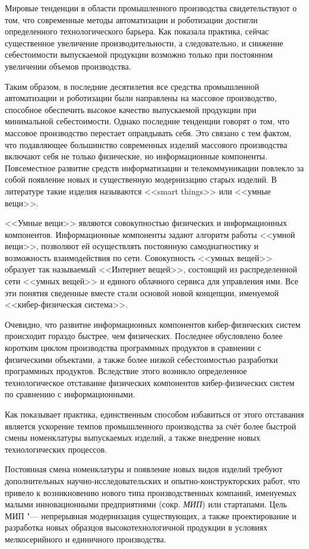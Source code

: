 
{\actuality} Мировые тенденции в области промышленного производства свидетельствуют о том, что современные методы автоматизации и роботизации достигли определенного технологического барьера. Как показала практика, сейчас существенное увеличение производительности, а следовательно, и снижение себестоимости выпускаемой продукции возможно только при постоянном увеличении объемов производства.

Таким образом, в последние десятилетия все средства промышленной автоматизации и роботизации были направлены на массовое производство, способное обеспечить высокое качество выпускаемой продукции при минимальной себестоимости. Однако последние тенденции говорят о том, что массовое производство перестает оправдывать себя. Это связано с тем фактом, что подавляющее большинство современных изделий массового производства включают себя не только физические, но информационные компоненты. Повсеместное развитие средств информатизации и телекоммуникации повлекло за собой появление новых и существенную модернизацию старых изделий. В литературе такие изделия называются <<smart things>> или <<умные вещи>>. 

<<Умные вещи>> являются совокупностью физических и информационных компонентов. Информационные компоненты задают алгоритм работы <<умной вещи>>, позволяют ей осуществлять постоянную самодиагностику и возможность взаимодействия по сети.  Совокупность <<умных вещей>> образует так называемый <<Интернет вещей>>, состоящий из распределенной сети <<умных вещей>> и единого облачного сервиса для управления ими. Все эти понятия сведенные вместе стали основой новой концепции, именуемой <<кибер-физическая система>>.

Очевидно, что развитие информационных компонентов кибер-физических систем происходит гораздо быстрее, чем физических. Последнее обусловлено более коротким циклом производства программных продуктов в сравнении с физическими объектами, а также более низкой себестоимостью разработки программных продуктов. Вследствие этого возникло определенное технологическое отставание физических компонентов кибер-физических систем по сравнению с информационными.

Как показывает практика, единственным способом избавиться от этого отставания является ускорение темпов промышленного производства за счёт более быстрой смены номенклатуры выпускаемых изделий, а также внедрение новых технологических процессов.

Постоянная смена номенклатуры и появление новых видов изделий требуют дополнительных научно-исследовательских и опытно-конструкторских работ, что привело к возникновению нового типа производственных компаний, именуемых малыми инновационными предприятиями (сокр. \textit{МИП}) или стартапами. Цель МИП "--- непрерывная модернизация существующих, а также проектирование и разработка новых образцов высокотехнологичной продукции в условиях мелкосерийного и единичного производства.

